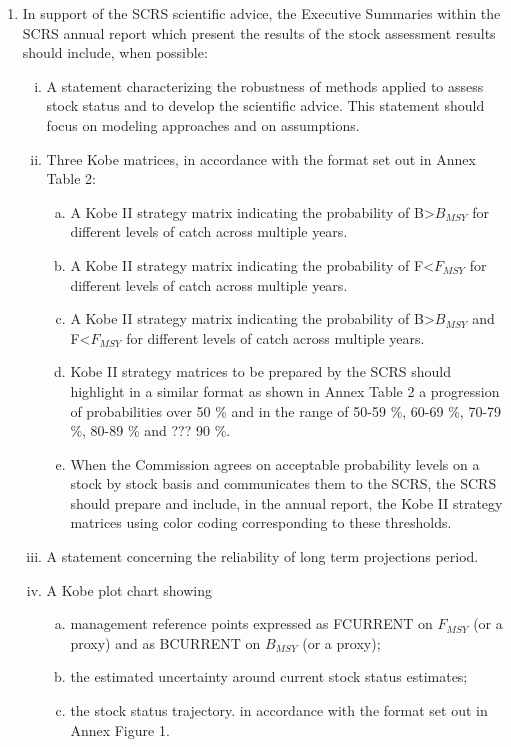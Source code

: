 \documentclass[a4paper, 11pt, oldtoc]{artikel1}
\begin{document}
  \begin{enumerate}
    \item  In support of the SCRS scientific advice, the Executive Summaries within the SCRS annual report which present the results of the stock assessment results should include, when possible: 
    \begin{enumerate}[i)]
      \item A statement characterizing the robustness of methods applied to assess stock status and to develop the scientific advice. This statement should focus on modeling approaches and on assumptions.
      \item Three Kobe matrices, in accordance with the format set out in Annex Table 2:
      \begin{enumerate}[(a)]
         \item A Kobe II strategy matrix indicating the probability of B>$B_{MSY}$ for different levels of catch across multiple years.
         \item A Kobe II strategy matrix indicating the probability of F<$F_{MSY}$ for different levels of catch across multiple years.
         \item A Kobe II strategy matrix indicating the probability of B>$B_{MSY}$ and F<$F_{MSY}$ for different levels of catch across multiple years.
         \item Kobe II strategy matrices to be prepared by the SCRS should highlight in a similar format as shown in Annex Table 2 a progression 
                 of probabilities over 50 \% and in the range of 50-59 \%, 60-69 \%, 70-79 \%, 80-89 \% and ??? 90 \%. 
         \item When the Commission agrees on acceptable probability levels on a stock by stock basis and communicates them to the SCRS, 
                 the SCRS should prepare and include, in the annual report, the  Kobe II strategy matrices using color coding corresponding to these thresholds.
      \end{enumerate}

      \item  A statement concerning the reliability of long term projections period.
      \item   A Kobe plot chart showing
      \begin{enumerate}[(a)]
        \item management reference points expressed as FCURRENT on $F_{MSY}$ (or a proxy) and as BCURRENT on $B_{MSY}$ (or a proxy);
        \item the estimated uncertainty around current stock status estimates;
        \item the stock status trajectory. in accordance with the format set out in Annex Figure 1.
      \end{enumerate}


\end{enumerate}
\end{enumerate}
\end{document}
